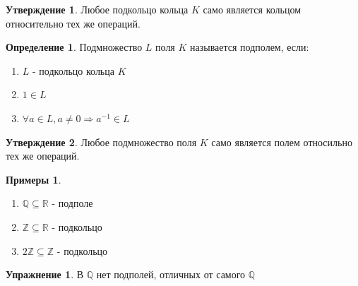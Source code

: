 \documentclass[a4paper, 12pt]{article}
\newcommand{\R}{\mathbb R}
\newcommand{\Q}{\mathbb Q}
\newcommand{\Z}{\mathbb Z}
\newcommand\tab[1][.5cm]{\hspace*{#1}}
\theoremstyle{definition}
\newtheorem*{definition}{Определение}
\newtheorem*{subtheorem}{Утверждение}
\newtheorem*{example}{Примеры}
\newtheorem*{lalala}{Упражнение}
\begin{document}
  \begin{subtheorem}
    Любое подкольцо кольца $K$ само является кольцом относительно тех же операций.  
  \end{subtheorem}
  \begin{definition}
    Подмножество $L$ поля $K$ называется подполем, если:
    \begin{enumerate}
      \item $L$ - подкольцо кольца $K$
      \item $1 \in L$
      \item $\forall a \in L, a \neq 0 \Longrightarrow a^{-1} \in L$   
    \end{enumerate}
  \end{definition}
  \begin{subtheorem}
    Любое подмножество поля $K$ само является полем относильно тех же операций.  
  \end{subtheorem}  
  \begin{example} \tab
    \begin{enumerate}
      \item $\Q \subseteq \R$ - подполе
      \item $\Z \subseteq \R$ - подкольцо
      \item $2\Z \subseteq \Z$ - подкольцо
    \end{enumerate}
  \end{example} 
  \begin{lalala}
    В $\Q$ нет подполей, отличных от самого $\Q$ 
  \end{lalala}
\end{document}
